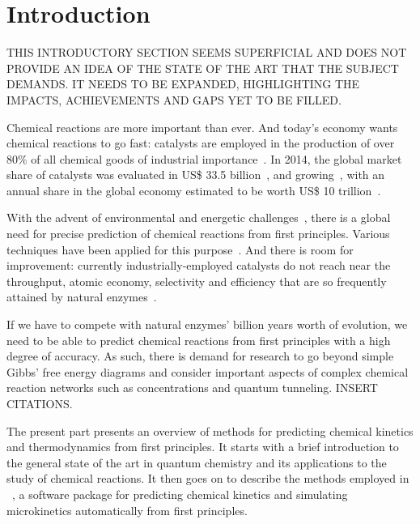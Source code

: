 \chapter{Introduction}%
\label{ch:introduction}

THIS INTRODUCTORY SECTION SEEMS SUPERFICIAL AND DOES NOT PROVIDE AN IDEA OF THE
STATE OF THE ART THAT THE SUBJECT DEMANDS\@.
IT NEEDS TO BE EXPANDED, HIGHLIGHTING THE IMPACTS, ACHIEVEMENTS AND GAPS YET TO
BE FILLED\@.

Chemical reactions are more important than ever.
And today's economy wants chemical reactions to go fast:
catalysts are employed in the production of over 80\% of all chemical
goods of industrial
importance~\cite{Breakthrough_Catalyst,GlobalCatalystMarket}.
In 2014, the global market share of catalysts was evaluated in US\$ 33.5
billion~\cite{GlobalCatalystMarket}, and growing~\cite{GlobalCatalystMarket},
with an annual share in the global economy estimated to be worth US\$ 10
trillion~\cite{GlobalCatalystMarket}.

With the advent of environmental and energetic challenges~\cite{Bertozzi_2016},
there is a global need for precise prediction of chemical reactions from first
principles.
Various techniques have been applied for this purpose~\cite{Cao2022}.
And there is room for improvement: currently industrially-employed catalysts do
not reach near the throughput, atomic economy, selectivity and efficiency that
are so frequently attained by natural
enzymes~\cite{Catalysis_in_Chemistry_and_Enzymology}.

If we have to compete with natural enzymes' billion years worth of evolution,
we need to be able to predict chemical reactions from first principles with a
high degree of accuracy.
As such, there is demand for research to go beyond simple Gibbs' free energy
diagrams and consider important aspects of complex chemical reaction networks
such as concentrations and quantum tunneling.
INSERT CITATIONS\@.

The present part presents an overview of methods for predicting chemical
kinetics and thermodynamics from first principles.
It starts with a brief introduction to the general state of the art in quantum
chemistry and its applications to the study of chemical reactions.
It then goes on to describe the methods employed in
\overreact~\cite{Schneider2022}, a software
package for predicting chemical kinetics and simulating microkinetics
automatically from first principles.
